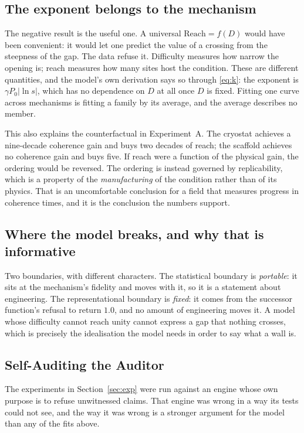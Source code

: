 \documentclass[conference]{IEEEtran}
\theoremstyle{definition}
\begin{document}
\subsection{The exponent belongs to the mechanism}

The negative result is the useful one. A universal $\mathrm{Reach}=f(D)$ would have
been convenient: it would let one predict the value of a crossing from the
steepness of the gap. The data refuse it. Difficulty measures how narrow the
opening is; reach measures how many sites host the condition. These are different
quantities, and the model's own derivation says so through \eqref{eq:k}: the
exponent is $\gamma P_0\lvert\ln s\rvert$, which has no dependence on $D$ at all
once $D$ is fixed. Fitting one curve across mechanisms is fitting a family by its
average, and the average describes no member.

This also explains the counterfactual in Experiment~A. The cryostat achieves a
nine-decade coherence gain and buys two decades of reach; the scaffold achieves no
coherence gain and buys five. If reach were a function of the physical gain, the
ordering would be reversed. The ordering is instead governed by replicability,
which is a property of the \emph{manufacturing} of the condition rather than of its
physics. That is an uncomfortable conclusion for a field that measures progress in
coherence times, and it is the conclusion the numbers support.

\subsection{Where the model breaks, and why that is informative}

Two boundaries, with different characters. The statistical boundary is
\emph{portable}: it sits at the mechanism's fidelity and moves with it, so it is a
statement about engineering. The representational boundary is \emph{fixed}: it
comes from the successor function's refusal to return $1.0$, and no amount of
engineering moves it. A model whose difficulty cannot reach unity cannot express a
gap that nothing crosses, which is precisely the idealisation the model needs in
order to say what a wall is.

\subsection{Self-Auditing the Auditor}
\label{sec:selfaudit}

The experiments in Section~\ref{sec:exp} were run against an engine whose own
purpose is to refuse unwitnessed claims. That engine was wrong in a way its tests
could not see, and the way it was wrong is a stronger argument for the model than
any of the fits above.
\end{document}
